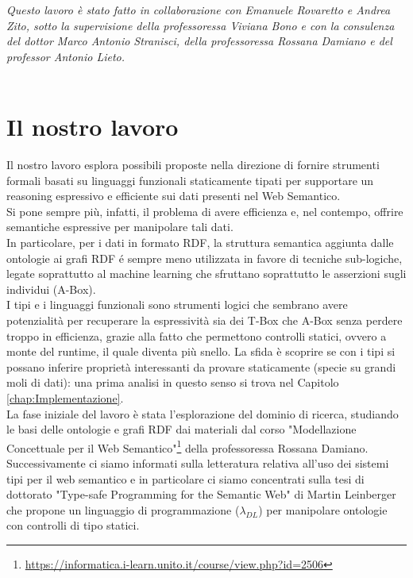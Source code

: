 \textsl{Questo lavoro è stato fatto in collaborazione con Emanuele Rovaretto e Andrea Zito, sotto la supervisione della professoressa Viviana Bono e con la consulenza del dottor Marco Antonio Stranisci, della professoressa Rossana Damiano e del professor Antonio Lieto.}\\\\


\section{Il nostro lavoro}
Il nostro lavoro esplora possibili proposte nella direzione di fornire strumenti formali basati su linguaggi funzionali staticamente tipati per supportare un reasoning
espressivo e efficiente sui dati presenti nel Web Semantico. 
\\Si pone sempre più, infatti, il problema di avere efficienza e, nel contempo, offrire semantiche espressive per manipolare tali dati. 
\\In particolare, per i dati in formato RDF, la struttura semantica aggiunta dalle ontologie ai grafi RDF \'e sempre meno utilizzata
in favore di tecniche sub-logiche, legate soprattutto al machine learning che sfruttano soprattutto le asserzioni sugli individui (A-Box). 
\\I tipi e i linguaggi funzionali sono strumenti logici che sembrano avere potenzialità per recuperare la espressività sia dei T-Box che A-Box senza perdere troppo in efficienza, grazie alla fatto che permettono controlli statici, ovvero a monte del runtime, il quale diventa più snello. La sfida è scoprire se con i tipi si possano inferire proprietà interessanti da provare staticamente (specie su grandi moli di dati): una prima analisi in questo senso si trova nel Capitolo \ref{chap:Implementazione}.
\\La fase iniziale del lavoro è stata l'esplorazione del dominio di ricerca,
studiando le basi delle ontologie e grafi RDF dai materiali dal corso "Modellazione Concettuale per il Web Semantico"\footnote{\url{https://informatica.i-learn.unito.it/course/view.php?id=2506}} 
della professoressa Rossana Damiano.
Successivamente ci siamo informati sulla letteratura relativa all'uso dei sistemi tipi per il web semantico e in particolare ci siamo concentrati sulla tesi di
dottorato "Type-safe Programming for the Semantic Web"\cite{leinbergerphdthesis} di Martin Leinberger che propone un linguaggio di programmazione ($\lambda_{DL}$) per manipolare ontologie con controlli di tipo statici. 
